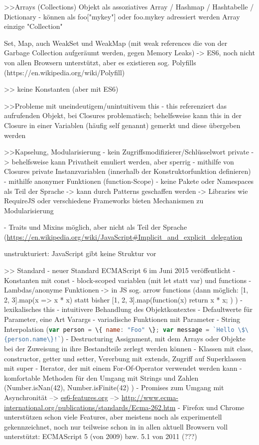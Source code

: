 \documentclass[a4paper, 12pt, hidelinks, listof=totoc, listoftables=totoc, bibliography=totoc]{scrreprt}
\newcommand{\js}[1]{\lstinline[language=JavaScript, style=inline]|#1|}
\begin{document}
>>Arrays (Collections)
Objekt als assoziatives Array / Hashmap / Hashtabelle / Dictionary
- können als foo["mykey"] oder foo.mykey adressiert werden
Array einzige "Collection"

Set, Map, auch WeakSet und WeakMap (mit weak references die von der Garbage Collection aufgeräumt werden, gegen Memory Leaks) -> ES6, noch nicht von allen Browsern unterstützt, aber es existieren sog. Polyfills (https://en.wikipedia.org/wiki/Polyfill)

>> keine Konstanten (aber mit ES6)

>>Probleme mit uneindeutigem/unintuitivem this
- this referenziert das aufrufenden Objekt, bei Closures problematisch; behelfsweise kann this in der Closure in einer Variablen (häufig self genannt) gemerkt und diese übergeben werden

>>Kapselung, Modularisierung
- kein Zugriffsmodifizierer/Schlüsselwort private
-> behelfsweise kann Privatheit emuliert werden, aber sperrig
	- mithilfe von Closures private Instanzvariablen (innerhalb der Konstruktorfunktion definieren)
	- mithilfe anonymer Funktionen (function-Scope)
- keine Pakete oder Namespaces als Teil der Sprache
-> kann durch Patterns geschaffen werden
-> Libraries wie RequireJS oder verschiedene Frameworks bieten Mechanismen zu Modularisierung

- Traits und Mixins möglich, aber nicht als Teil der Sprache (\url{https://en.wikipedia.org/wiki/JavaScript#Implicit_and_explicit_delegation}

unstrukturiert: JavaScript gibt keine Struktur vor


>> Standard
- neuer Standard ECMAScript 6 im Juni 2015 veröffentlicht
	- Konstanten mit const
	- block-scoped variablen (mit let statt var) und functions
	- Lambdas/anonyme Funktionen -> in JS sog. arrow functions (dann möglich: [1, 2, 3].map(x => x * x) statt bisher [1, 2, 3].map(function(x) { return x * x; }) )
	- lexikalisches this - intuitivere Behandlung des Objektkontextes
	- Defaultwerte für Parameter, eine Art Varargs
	- variadische Funktionen mit Parameter
	- String Interpolation (\js{var person = \{ name: "Foo" \}; var message = `Hello \$\{person.name\}!`})
	- Destructuring Assignment, mit dem Arrays oder Objekte bei der Zuweisung in ihre Bestandteile zerlegt werden können
	- Klassen mit class, constructor, getter und setter, Vererbung mit extends, Zugriff auf Superklassen mit super
	- Iterator, der mit einem For-Of-Operator verwendet werden kann
	- komfortable Methoden für den Umgang mit Strings und Zahlen (Number.isNan(42), Number.isFinite(42) )
	- Promises zum Umgang mit Asynchronität
	-->  \url{es6-features.org}
	-->  \url{http://www.ecma-international.org/publications/standards/Ecma-262.htm}
- Firefox und Chrome unterstützen schon viele Features, aber meistens noch als experimentell gekennzeichnet, noch nur teilweise schon in
in allen aktuell Browsern voll unterstützt: ECMAScript 5 (von 2009) bzw. 5.1 von 2011 (???)
\end{document}
